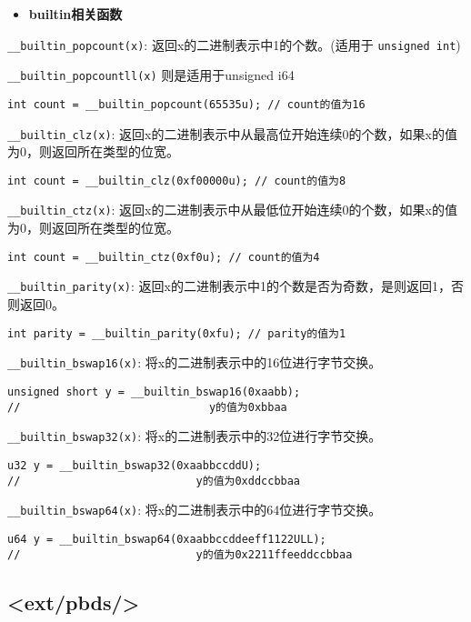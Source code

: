 \documentclass[a4paper,landscape,twocolumn]{ctexart}
\newcommand{\point}[1]{
	\begin{itemize}
		\item \textbf{#1}
	\end{itemize}
}
\begin{document}
\point{builtin相关函数}

\texttt{\_\_builtin\_popcount(x)}: 返回x的二进制表示中1的个数。(适用于 \texttt{unsigned int})

\texttt{\_\_builtin\_popcountll(x)} 则是适用于unsigned i64

\begin{lstlisting}
int count = __builtin_popcount(65535u); // count的值为16
\end{lstlisting}

\texttt{\_\_builtin\_clz(x)}: 返回x的二进制表示中从最高位开始连续0的个数，如果x的值为0，则返回所在类型的位宽。

\begin{lstlisting}
int count = __builtin_clz(0xf00000u); // count的值为8
\end{lstlisting}

\texttt{\_\_builtin\_ctz(x)}: 返回x的二进制表示中从最低位开始连续0的个数，如果x的值为0，则返回所在类型的位宽。

\begin{lstlisting}
int count = __builtin_ctz(0xf0u); // count的值为4
\end{lstlisting}

\texttt{\_\_builtin\_parity(x)}: 返回x的二进制表示中1的个数是否为奇数，是则返回1，否则返回0。

\begin{lstlisting}
int parity = __builtin_parity(0xfu); // parity的值为1
\end{lstlisting}

\texttt{\_\_builtin\_bswap16(x)}: 将x的二进制表示中的16位进行字节交换。
\begin{lstlisting}
unsigned short y = __builtin_bswap16(0xaabb);
//                             y的值为0xbbaa
\end{lstlisting}

\texttt{\_\_builtin\_bswap32(x)}: 将x的二进制表示中的32位进行字节交换。

\begin{lstlisting}
u32 y = __builtin_bswap32(0xaabbccddU);
//                           y的值为0xddccbbaa
\end{lstlisting}

\texttt{\_\_builtin\_bswap64(x)}: 将x的二进制表示中的64位进行字节交换。
\begin{lstlisting}
u64 y = __builtin_bswap64(0xaabbccddeeff1122ULL);
//                           y的值为0x2211ffeeddccbbaa
\end{lstlisting}

\subsection{<ext/pbds/>}
\end{document}
